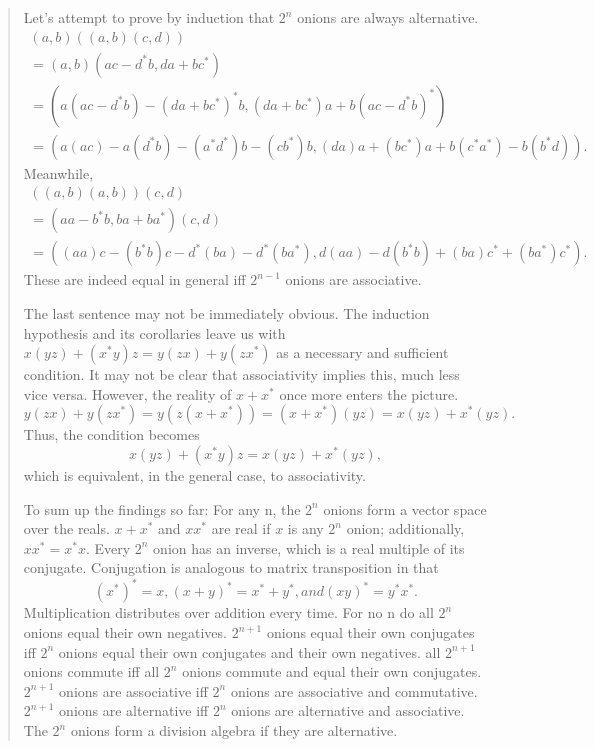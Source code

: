 \documentclass{article}
\begin{document}
\begin{quote}
Let's attempt to prove by induction that \(2^n\) onions are always
alternative. \[
  \begin{gathered}
    (a, b) ((a, b) (c, d))
  \\= (a, b) (a c - d^* b, d a + b c^*)
  \\= (a (a c - d^* b) - (d a + b c^*)^* b, (d a + b c^*) a + b (a c - d^* b)^*)
  \\= (a(ac) - a(d^* b) - (a^* d^*)b - (c b^*)b, (da)a + (b c^*)a + b(c^* a^*) - b(b^* d)).
  \end{gathered}
\] Meanwhile, \[
  \begin{gathered}
    ((a, b) (a, b)) (c, d)
  \\= (a a - b^* b, b a + b a^*) (c, d)
  \\= ((aa)c - (b^* b)c - d^* (ba) - d^* (b a^*),d(aa) - d(b^* b) + (ba) c^* + (b a^*) c^*).
  \end{gathered}
\] These are indeed equal in general iff \(2^{n-1}\) onions are
associative.

The last sentence may not be immediately obvious. The induction
hypothesis and its corollaries leave us with
\(x (y z) + (x^* y) z = y (z x) + y (z x^*)\) as a necessary and
sufficient condition. It may not be clear that associativity implies
this, much less vice versa. However, the reality of \(x + x^*\) once
more enters the picture.
\[y (z x) + y (z x^*) = y (z (x + x^*)) = (x + x^*) (y z) = x (y z) + x^* (y z).\]
Thus, the condition becomes
\[x (y z) + (x^* y) z = x (y z) + x^* (y z),\] which is equivalent, in
the general case, to associativity.

To sum up the findings so far: For any n, the \(2^n\) onions form a
vector space over the reals. \(x + x^*\) and \(x x^*\) are real if \(x\)
is any \(2^n\) onion; additionally, \(x x^* = x^* x.\) Every \(2^n\)
onion has an inverse, which is a real multiple of its conjugate.
Conjugation is analogous to matrix transposition in that
\[(x^*)^* = x, (x + y)^* = x^* + y^*, and (x y)^* = y^* x^*.\]
Multiplication distributes over addition every time. For no n do all
\(2^n\) onions equal their own negatives. \(2^{n+1}\) onions equal their
own conjugates iff \(2^n\) onions equal their own conjugates and their
own negatives. all \(2^{n+1}\) onions commute iff all \(2^n\) onions
commute and equal their own conjugates. \(2^{n+1}\) onions are
associative iff \(2^n\) onions are associative and commutative.
\(2^{n+1}\) onions are alternative iff \(2^n\) onions are alternative
and associative. The \(2^n\) onions form a division algebra if they are
alternative.


\end{quote}
\end{document}
